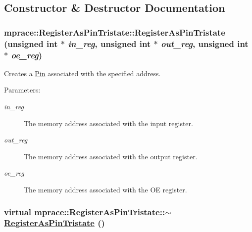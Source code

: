 \subsection{Constructor \& Destructor Documentation}
\hypertarget{classmprace_1_1RegisterAsPinTristate_a0}{
\subsubsection[RegisterAsPinTristate]{\setlength{\rightskip}{0pt plus 5cm}mprace::Register\-As\-Pin\-Tristate::Register\-As\-Pin\-Tristate (unsigned int $\ast$ {\em in\_\-reg}, unsigned int $\ast$ {\em out\_\-reg}, unsigned int $\ast$ {\em oe\_\-reg})}}
\label{classmprace_1_1RegisterAsPinTristate_a0}


Creates a \hyperlink{classmprace_1_1Pin}{Pin} associated with the specified address. 

\begin{Desc}
\item[Parameters:]
\begin{description}
\item[{\em in\_\-reg}]The memory address associated with the input register. \item[{\em out\_\-reg}]The memory address associated with the output register. \item[{\em oe\_\-reg}]The memory address associated with the OE register.\end{description}
\end{Desc}
\hypertarget{classmprace_1_1RegisterAsPinTristate_a1}{
\subsubsection[$\sim$RegisterAsPinTristate]{\setlength{\rightskip}{0pt plus 5cm}virtual mprace::Register\-As\-Pin\-Tristate::$\sim$\hyperlink{classmprace_1_1RegisterAsPinTristate}{Register\-As\-Pin\-Tristate} ()}}
\label{classmprace_1_1RegisterAsPinTristate_a1}


